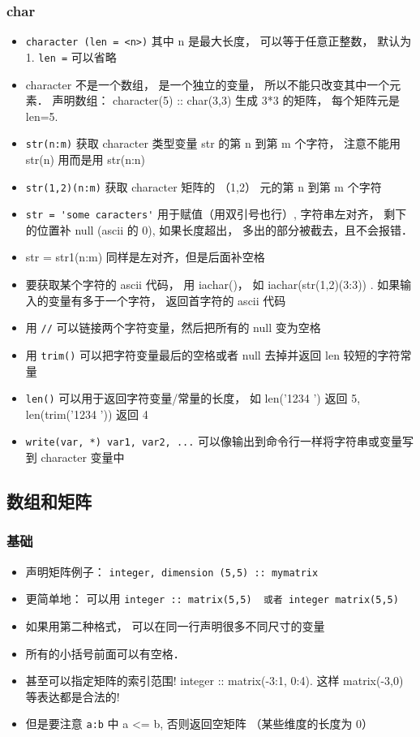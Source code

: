 \subsubsection{char}
\begin{itemize}
\item \verb`character (len = <n>)` 其中 n 是最大长度， 可以等于任意正整数， 默认为 1.  \verb`len =` 可以省略
\item character 不是一个数组， 是一个独立的变量， 所以不能只改变其中一个元素． 声明数组： character(5) :: char(3,3) 生成 3*3 的矩阵， 每个矩阵元是 len=5.
\item \verb`str(n:m)` 获取 character 类型变量 str 的第 n 到第 m 个字符， 注意不能用 str(n) 用而是用 str(n:n)
\item \verb`str(1,2)(n:m)` 获取 character 矩阵的 （1,2） 元的第 n 到第 m 个字符
\item \verb`str = 'some caracters'` 用于赋值（用双引号也行）, 字符串左对齐， 剩下的位置补 null (ascii 的 0), 如果长度超出， 多出的部分被截去，且不会报错．
\item str = str1(n:m) 同样是左对齐，但是后面补空格
\item 要获取某个字符的 ascii 代码， 用 iachar()， 如 iachar(str(1,2)(3:3)) . 如果输入的变量有多于一个字符， 返回首字符的 ascii 代码
\item 用 \verb`//` 可以链接两个字符变量，然后把所有的 null 变为空格
\item 用 \verb`trim()` 可以把字符变量最后的空格或者 null 去掉并返回 len 较短的字符常量
\item \verb`len()` 可以用于返回字符变量/常量的长度， 如 len('1234 ') 返回 5, len(trim('1234 ')) 返回 4
\item \verb`write(var, *) var1, var2, ...` 可以像输出到命令行一样将字符串或变量写到 character 变量中
\end{itemize}

\subsection{数组和矩阵}
\subsubsection{基础}
\begin{itemize}
\item 声明矩阵例子：  \verb`integer, dimension (5,5) :: mymatrix`
\item 更简单地： 可以用 \verb`integer :: matrix(5,5)  或者 integer matrix(5,5)`
\item 如果用第二种格式， 可以在同一行声明很多不同尺寸的变量
\item 所有的小括号前面可以有空格．
\item 甚至可以指定矩阵的索引范围!   integer :: matrix(-3:1, 0:4). 这样 matrix(-3,0) 等表达都是合法的!
\item 但是要注意 \verb`a:b` 中 a <= b, 否则返回空矩阵 （某些维度的长度为 0）
\end{itemize}

